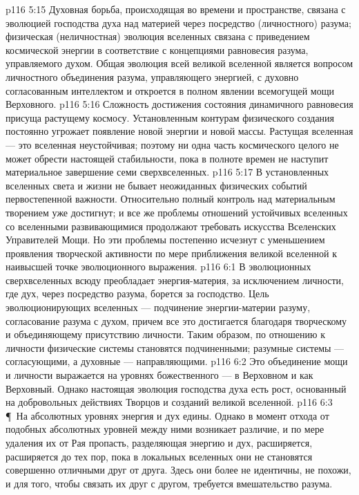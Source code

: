 \vs p116 5:15 Духовная борьба, происходящая во времени и пространстве, связана с эволюцией господства духа над материей через посредство (личностного) разума; физическая (неличностная) эволюция вселенных связана с приведением космической энергии в соответствие с концепциями равновесия разума, управляемого духом. Общая эволюция всей великой вселенной является вопросом личностного объединения разума, управляющего энергией, с духовно согласованным интеллектом и откроется в полном явлении всемогущей мощи Верховного.
\vs p116 5:16 Сложность достижения состояния динамичного равновесия присуща растущему космосу. Установленным контурам физического создания постоянно угрожает появление новой энергии и новой массы. Растущая вселенная --- это вселенная неустойчивая; поэтому ни одна часть космического целого не может обрести настоящей стабильности, пока в полноте времен не наступит материальное завершение семи сверхвселенных.
\vs p116 5:17 В установленных вселенных света и жизни не бывает неожиданных физических событий первостепенной важности. Относительно полный контроль над материальным творением уже достигнут; и все же проблемы отношений устойчивых вселенных со вселенными развивающимися продолжают требовать искусства Вселенских Управителей Мощи. Но эти проблемы постепенно исчезнут с уменьшением проявления творческой активности по мере приближения великой вселенной к наивысшей точке эволюционного выражения.
\vs p116 6:1 В эволюционных сверхвселенных всюду преобладает энергия\hyp{}материя, за исключением личности, где дух, через посредство разума, борется за господство. Цель эволюционирующих вселенных --- подчинение энергии\hyp{}материи разуму, согласование разума с духом, причем все это достигается благодаря творческому и объединяющему присутствию личности. Таким образом, по отношению к личности физические системы становятся подчиненными; разумные системы --- согласующими, а духовные --- направляющими.
\vs p116 6:2 Это объединение мощи и личности выражается на уровнях божественного --- в Верховном и как Верховный. Однако настоящая эволюция господства духа есть рост, основанный на добровольных действиях Творцов и созданий великой вселенной.
\vs p116 6:3 \P\ На абсолютных уровнях энергия и дух едины. Однако в момент отхода от подобных абсолютных уровней между ними возникает различие, и по мере удаления их от Рая пропасть, разделяющая энергию и дух, расширяется, расширяется до тех пор, пока в локальных вселенных они не становятся совершенно отличными друг от друга. Здесь они более не идентичны, не похожи, и для того, чтобы связать их друг с другом, требуется вмешательство разума.
